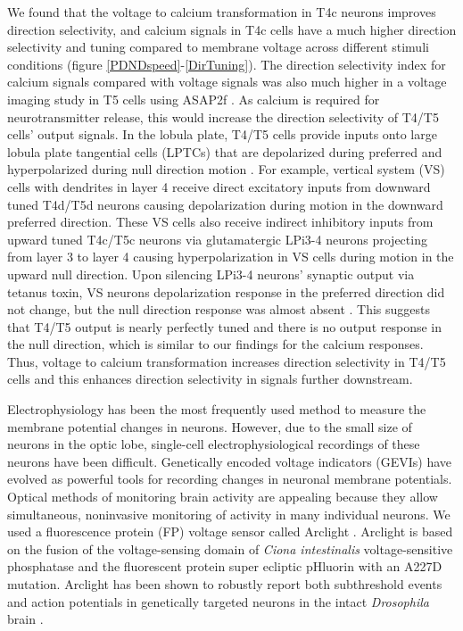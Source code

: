 \documentclass[9pt,lineno]{elife}
\begin{document}
We found that the voltage to calcium transformation in T4c neurons improves direction selectivity, and calcium signals in T4c cells have a much higher direction selectivity and tuning compared to membrane voltage across different stimuli conditions (figure \ref{PDNDspeed}-\ref{DirTuning}). The direction selectivity index for calcium signals compared with voltage signals was also much higher in a voltage imaging study in T5 cells using ASAP2f \parencite{Wienecke2018}. As calcium is required for neurotransmitter release, this would increase the direction selectivity of T4/T5 cells' output signals. In the lobula plate, T4/T5 cells provide inputs onto large lobula plate tangential cells (LPTCs) that are depolarized during preferred and hyperpolarized during null direction motion \parencite{Mauss2014}. For example, vertical system (VS) cells with dendrites in layer 4 receive direct excitatory inputs from downward tuned T4d/T5d neurons causing depolarization during motion in the downward preferred direction. These VS cells also receive indirect inhibitory inputs from upward tuned T4c/T5c neurons via glutamatergic LPi3-4 neurons projecting from layer 3 to layer 4 causing hyperpolarization in VS cells during motion in the upward null direction. Upon silencing LPi3-4 neurons’ synaptic output via tetanus toxin, VS neurons depolarization response in the preferred direction did not change, but the null direction response was almost absent \parencite{Mauss2015}. This suggests that T4/T5 output is nearly perfectly tuned and there is no output response in the null direction, which is similar to our findings for the calcium responses. Thus, voltage to calcium transformation increases direction selectivity in T4/T5 cells and this enhances direction selectivity in signals further downstream. 


Electrophysiology has been the most frequently used method to measure the membrane potential changes in neurons. However, due to the small size of neurons in the optic lobe, single-cell electrophysiological recordings of these neurons have been difficult. Genetically encoded voltage indicators (GEVIs) have evolved as powerful tools for recording changes in neuronal membrane potentials. Optical methods of monitoring brain activity are appealing because they allow simultaneous, noninvasive monitoring of activity in many individual neurons. We used a fluorescence protein (FP) voltage sensor called Arclight \parencite{Jin2012}. Arclight is based on the fusion of the voltage-sensing domain of \textit{Ciona intestinalis} voltage-sensitive phosphatase \parencite{Murata2005} and the fluorescent protein super ecliptic pHluorin with an A227D mutation. Arclight has been shown to robustly report both subthreshold events and action potentials in genetically targeted neurons in the intact \textit{Drosophila} brain \parencite{Cao2013}. 
\end{document}
